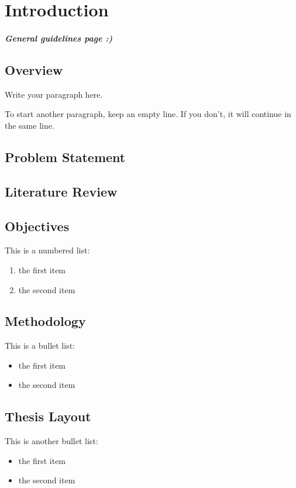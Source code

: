 \chapter{Introduction}

\paragraph{General guidelines page :) }


\section{Overview}
Write your paragraph here.

To start another paragraph, keep an empty line.
If you don't, it will continue in the same line.

\section{Problem Statement}
\section{Literature Review}
\section{Objectives}

This is a numbered list:
\begin{enumerate}
    \item the first item
    \item the second item
\end{enumerate}

\section{Methodology}
This is a bullet list: 
\begin{itemize}
    \item the first item
    \item the second item
\end{itemize}

\section{Thesis Layout}

This is another bullet list: 
\begin{itemize}[label=-]
    \item the first item
    \item the second item
\end{itemize}